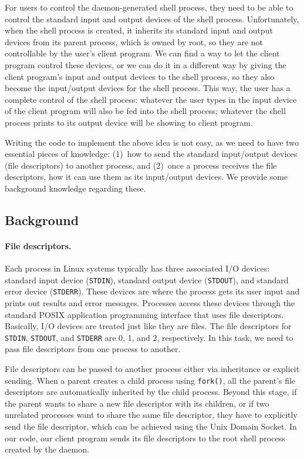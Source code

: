 For users to control the daemon-generated shell process, they need to be able to control the 
standard input and output devices of the shell process. Unfortunately, when the shell process is
created, it inherits its standard input and output devices from its parent process, which is
owned by root, so they are not controllable by the user's client program. We can find a way to
let the client program control these devices, or we can do it in a different way by 
giving the client program's input and output devices to the shell process, so they also become the
input/output devices for the shell process. This way, the user has a complete control of the
shell process: whatever the user types in the input
device of the client program will also be fed into the shell process; whatever the shell
process prints to its output device will be showing to client program. 


Writing the code to implement the above idea is not easy, as we need to have two essential
pieces of knowledge: (1)~how to send the standard input/output devices (file descriptors) to
another process, and (2)~once a process receives the file descriptors, how it can use them as
its input/output devices. We provide some background knowledge regarding these.


\subsection{Background}


\paragraph{File descriptors.}


Each process in Linux systems typically has three associated 
I/O devices: standard input device (\texttt{STDIN}), standard output device
(\texttt{STDOUT}), and standard error device (\texttt{STDERR}). These
devices are where the process gets its user input and prints out results and error
messages. Processes access these devices through the standard POSIX application
programming interface that uses file descriptors. Basically, I/O
devices are treated just like they are files. 
The file descriptors for 
\texttt{STDIN},  \texttt{STDOUT}, and \texttt{STDERR} are 0, 1, and 2, respectively. 
In this task, we need to pass file descriptors from one process to another.


File descriptors can be passed to another process  either via
inheritance or explicit sending. When a parent creates a child process using
\texttt{fork()}, all the parent's file descriptors are automatically inherited by 
the child process. Beyond this stage, if the parent wants to share a new file descriptor with
its children, or if two unrelated processes want to share the same file descriptor, they have to
explicitly send the file descriptor, which can be achieved using the Unix Domain Socket. 
In our code, our client program sends its file descriptors to the 
root shell process created by the daemon.


